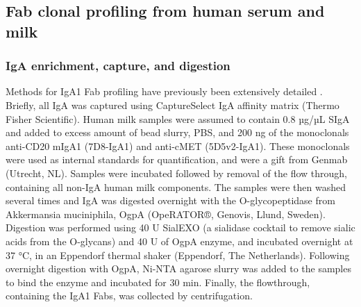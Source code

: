 \subsection{Fab clonal profiling from human serum and milk}

\subsubsection{IgA enrichment, capture, and digestion}
Methods for IgA1 Fab profiling have previously been extensively detailed \cite{bondt2021human, bondt2021direct}. Briefly, all IgA was captured using CaptureSelect IgA affinity matrix (Thermo Fisher Scientific). Human milk samples were assumed to contain 0.8 µg/µL SIgA and added to excess amount of bead slurry, PBS, and 200 ng of the monoclonals anti-CD20 mIgA1 (7D8-IgA1) and anti-cMET (5D5v2-IgA1). These monoclonals were used as internal standards for quantification, and were a gift from Genmab (Utrecht, NL). Samples were incubated followed by removal of the flow through, containing all non-IgA human milk components. The samples were then washed several times and IgA was digested overnight with the O-glycopeptidase from Akkermansia muciniphila, OgpA (OpeRATOR®, Genovis, Llund, Sweden). Digestion was performed using 40 U SialEXO (a sialidase cocktail to remove sialic acids from the O-glycans) and 40 U of OgpA enzyme, and incubated overnight at 37 °C, in an Eppendorf thermal shaker (Eppendorf, The Netherlands). Following overnight digestion with OgpA, Ni-NTA agarose slurry was added to the samples to bind the enzyme and incubated for 30 min. Finally, the flowthrough, containing the IgA1 Fabs, was collected by centrifugation.


